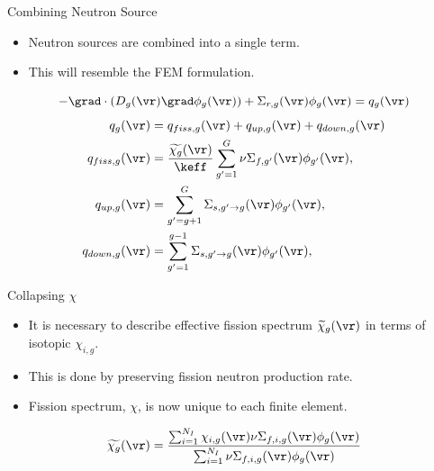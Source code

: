 \begin{frame}{Combining Neutron Source}
  \begin{itemize}
    \item Neutron sources are combined into a single term.
    \item This will resemble the FEM formulation.
  \end{itemize}
  \begin{equation}
    \label{eq:multigroup_source}
    - \grad \cdot( D_g(\vr) \grad \phi_g(\vr)) + \Sigma_{r,g}(\vr) \phi_g(\vr) = 
      q_g(\vr)
  \end{equation}
  \begin{align}
    \label{eq:q}
    q_g(\vr) &= q_{fiss,g}(\vr) + q_{up,g}(\vr) + q_{down,g}(\vr) \\
    \label{eq:qfiss}
    q_{fiss,g}(\vr) &= \frac{\widetilde{\chi_g}(\vr)}{\keff} \sum_{g'=1}^{G} 
      \nu \Sigma_{f,g'}(\vr) \phi_{g'}(\vr), \\
    \label{eq:qup}
    q_{up,g}(\vr) &= \sum_{g'=g+1}^{G} \Sigma_{s,g' \rightarrow g}(\vr)
      \phi_{g'}(\vr), \\
    \label{eq:qdown}
    q_{down,g}(\vr) &= \sum_{g'=1}^{g-1} \Sigma_{s,g' \rightarrow g}(\vr)
      \phi_{g'}(\vr),
  \end{align}
\end{frame}

\begin{frame}{Collapsing $\chi$}
  \begin{itemize}
    \item It is necessary to describe effective fission spectrum
      $\widetilde{\chi}_g(\vr)$ in terms of isotopic $\chi_{i,g}$.
    \item This is done by preserving fission neutron production rate.
    \item Fission spectrum, $\chi$, is now unique to each finite element.
  \end{itemize}
  \begin{equation}
    \label{eq:chi_collapse}
    \widetilde{\chi_g}(\vr) = \frac{\sum_{i=1}^{N_I} \chi_{i,g}(\vr)
      \nu \Sigma_{f,i,g}(\vr) \phi_g(\vr)}
      {\sum_{i=1}^{N_I} \nu \Sigma_{f,i,g}(\vr) \phi_g(\vr)}
  \end{equation}
\end{frame}

